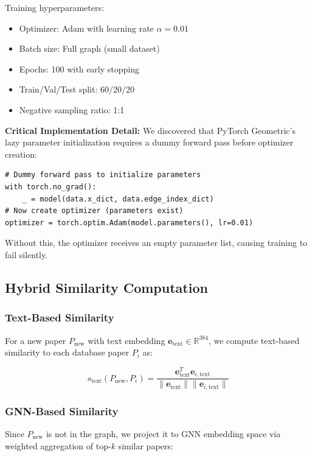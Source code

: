 \documentclass[conference]{IEEEtran}
\begin{document}
Training hyperparameters:
\begin{itemize}
    \item Optimizer: Adam with learning rate $\alpha = 0.01$
    \item Batch size: Full graph (small dataset)
    \item Epochs: 100 with early stopping
    \item Train/Val/Test split: 60/20/20
    \item Negative sampling ratio: 1:1
\end{itemize}

\textbf{Critical Implementation Detail:} We discovered that PyTorch Geometric's lazy parameter initialization requires a dummy forward pass before optimizer creation:

\begin{verbatim}
# Dummy forward pass to initialize parameters
with torch.no_grad():
    _ = model(data.x_dict, data.edge_index_dict)
# Now create optimizer (parameters exist)
optimizer = torch.optim.Adam(model.parameters(), lr=0.01)
\end{verbatim}

Without this, the optimizer receives an empty parameter list, causing training to fail silently.

\subsection{Hybrid Similarity Computation}

\subsubsection{Text-Based Similarity}
For a new paper $P_{\text{new}}$ with text embedding $\mathbf{e}_{\text{text}} \in \mathbb{R}^{384}$, we compute text-based similarity to each database paper $P_i$ as:

\begin{equation}
s_{\text{text}}(P_{\text{new}}, P_i) = \frac{\mathbf{e}_{\text{text}}^T \mathbf{e}_{i,\text{text}}}{\|\mathbf{e}_{\text{text}}\| \|\mathbf{e}_{i,\text{text}}\|}
\end{equation}

\subsubsection{GNN-Based Similarity}
Since $P_{\text{new}}$ is not in the graph, we project it to GNN embedding space via weighted aggregation of top-$k$ similar papers:
\end{document}
